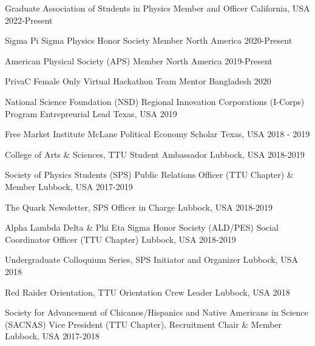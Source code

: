 
\begin{cventries}

    \cventry
    {Graduate Association of Students in Physics}
    {Member and Officer}
    {California, USA}
    {2022-Present}
    {}

    \cventry
    {Sigma Pi Sigma Physics Honor Society}
    {Member}
    {North America}
    {2020-Present}
    {}

    \cventry
    {American Physical Society (APS)}
    {Member}
    {North America}
    {2019-Present}
    {}

    \cventry
    {PrivaC Female Only Virtual Hackathon}
    {Team Mentor}
    {Bangladesh}
    {2020}
    {}



    \cventry
    {National Science Foundation (NSD) Regional Innovation Corporations (I-Corps) Program}
    {Entrepreurial Lead}
    {Texas, USA}
    {2019}
    {}

    \cventry
    {Free Market Institute}
    {McLane Political Economy Scholar}
    {Texas, USA}
    {2018 - 2019}
    {}

    \cventry
    {College of Arts \& Sciences, TTU}
    {Student Ambassador}
    {Lubbock, USA}
    {2018-2019}
    {}

    \cventry
    {Society of Physics Students (SPS)}
    {Public Relations Officer (TTU Chapter) \& Member}
    {Lubbock, USA}
    {2017-2019}
    {}

    \cventry
    {The Quark Newsletter, SPS}
    {Officer in Charge}
    {Lubbock, USA}
    {2018-2019}
    {}

    \cventry
    {Alpha Lambda Delta \& Phi Eta Sigma Honor Society (ALD/PES)}
    {Social Coordinator Officer (TTU Chapter)}
    {Lubbock, USA}
    {2018-2019}
    {}

    \cventry
    {Undergraduate Colloquium Series, SPS}
    {Initiator and Organizer}
    {Lubbock, USA}
    {2018}
    {}


    \cventry
    {Red Raider Orientation, TTU}
    {Orientation Crew Leader}
    {Lubbock, USA}
    {2018}
    {}

    \cventry
    {Society for Advancement of Chicanos/Hispanics and Native Americans in Science (SACNAS)}
    {Vice President (TTU Chapter), Recruitment Chair \& Member}
    {Lubbock, USA}
    {2017-2018}
    {}


\end{cventries}


